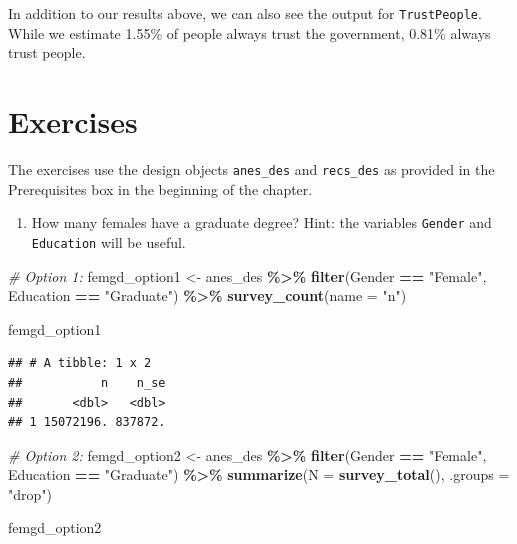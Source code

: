 \documentclass[
]{krantz}
\makeatletter
\newenvironment{Shaded}{\begin{snugshade}}{\end{snugshade}}
\newcommand{\AttributeTok}[1]{\textcolor[rgb]{0.27,0.27,0.27}{#1}}
\newcommand{\CommentTok}[1]{\textcolor[rgb]{0.37,0.37,0.37}{\textit{#1}}}
\newcommand{\FunctionTok}[1]{\textcolor[rgb]{0.27,0.27,0.27}{\textbf{#1}}}
\newcommand{\NormalTok}[1]{#1}
\newcommand{\OtherTok}[1]{\textcolor[rgb]{0.37,0.37,0.37}{#1}}
\newcommand{\SpecialCharTok}[1]{\textcolor[rgb]{0.43,0.43,0.43}{\textbf{#1}}}
\newcommand{\StringTok}[1]{\textcolor[rgb]{0.5,0.5,0.5}{#1}}
\providecommand{\tightlist}{%
  \setlength{\itemsep}{0pt}\setlength{\parskip}{0pt}}
\newenvironment{kframe}{%
\medskip{}
\setlength{\fboxsep}{.8em}
 \def\at@end@of@kframe{}%
 \ifinner\ifhmode%
  \def\at@end@of@kframe{\end{minipage}}%
  \begin{minipage}{\columnwidth}%
 \fi\fi%
 \def\FrameCommand##1{\hskip\@totalleftmargin \hskip-\fboxsep
 \colorbox{shadecolor}{##1}\hskip-\fboxsep
     \hskip-\linewidth \hskip-\@totalleftmargin \hskip\columnwidth}%
 \MakeFramed {\advance\hsize-\width
   \@totalleftmargin\z@ \linewidth\hsize
   \@setminipage}}%
 {\par\unskip\endMakeFramed%
 \at@end@of@kframe}
\renewenvironment{Shaded}{\begin{kframe}}{\end{kframe}}
\makeatother
\begin{document}
In addition to our results above, we can also see the output for \texttt{TrustPeople}. While we estimate 1.55\% of people always trust the government, 0.81\% always trust people.

\hypertarget{exercises}{%
\section{Exercises}\label{exercises}}

The exercises use the design objects \texttt{anes\_des} and \texttt{recs\_des} as provided in the Prerequisites box in the beginning of the chapter.

\begin{enumerate}
\def\labelenumi{\arabic{enumi}.}
\tightlist
\item
  How many females have a graduate degree? Hint: the variables \texttt{Gender} and \texttt{Education} will be useful.
\end{enumerate}

\begin{Shaded}
\begin{Highlighting}[]
\CommentTok{\# Option 1:}
\NormalTok{femgd\_option1 }\OtherTok{\textless{}{-}}\NormalTok{ anes\_des }\SpecialCharTok{\%\textgreater{}\%}
  \FunctionTok{filter}\NormalTok{(Gender }\SpecialCharTok{==} \StringTok{"Female"}\NormalTok{, Education }\SpecialCharTok{==} \StringTok{"Graduate"}\NormalTok{) }\SpecialCharTok{\%\textgreater{}\%}
  \FunctionTok{survey\_count}\NormalTok{(}\AttributeTok{name =} \StringTok{"n"}\NormalTok{)}

\NormalTok{femgd\_option1}
\end{Highlighting}
\end{Shaded}

\begin{verbatim}
## # A tibble: 1 x 2
##           n    n_se
##       <dbl>   <dbl>
## 1 15072196. 837872.
\end{verbatim}

\begin{Shaded}
\begin{Highlighting}[]
\CommentTok{\# Option 2:}
\NormalTok{femgd\_option2 }\OtherTok{\textless{}{-}}\NormalTok{ anes\_des }\SpecialCharTok{\%\textgreater{}\%}
  \FunctionTok{filter}\NormalTok{(Gender }\SpecialCharTok{==} \StringTok{"Female"}\NormalTok{, Education }\SpecialCharTok{==} \StringTok{"Graduate"}\NormalTok{) }\SpecialCharTok{\%\textgreater{}\%}
  \FunctionTok{summarize}\NormalTok{(}\AttributeTok{N =} \FunctionTok{survey\_total}\NormalTok{(), }\AttributeTok{.groups =} \StringTok{"drop"}\NormalTok{)}

\NormalTok{femgd\_option2}
\end{Highlighting}
\end{Shaded}
\end{document}
